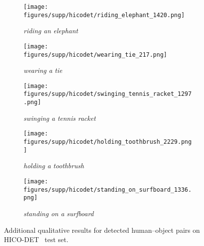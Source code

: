 \documentclass[10pt,twocolumn,letterpaper]{article}
\begin{document}
\begin{figure*}
    \begin{subfigure}[t]{0.19\linewidth}
        \centering
        \texttt{[image: figures/supp/hicodet/riding\_elephant\_1420.png]}
        \caption{\textit{riding an elephant}}
        \label{fig:riding-elephant}
    \end{subfigure}
    \hspace{4pt}
    \begin{subfigure}[t]{0.19\linewidth}
        \centering
        \texttt{[image: figures/supp/hicodet/wearing\_tie\_217.png]}
        \caption{\textit{wearing a tie}}
        \label{fig:wearing-tie}
    \end{subfigure}
    \hspace{-1pt}
    \begin{subfigure}[t]{0.19\linewidth}
        \centering
        \texttt{[image: figures/supp/hicodet/swinging\_tennis\_racket\_1297.png]}
        \caption{\textit{swinging a tennis racket}}
        \label{fig:swinging-tennis-racket}
    \end{subfigure}
    \hfill \begin{subfigure}[t]{0.19\linewidth}
        \centering
        \texttt{[image: figures/supp/hicodet/holding\_toothbrush\_2229.png]}
        \caption{\textit{holding a toothbrush}}
        \label{fig:holding-toothbrush}
    \end{subfigure}
    \hfill \begin{subfigure}[t]{0.19\linewidth}
        \centering
        \texttt{[image: figures/supp/hicodet/standing\_on\_surfboard\_1336.png]}
        \caption{\textit{standing on a surfboard}}
        \label{fig:standing-on-surfboard}
    \end{subfigure}
    \caption{Additional qualitative results for detected human--object pairs on HICO-DET~\cite{hicodet} test set.}
    \label{fig:qual-hicodet}
\end{figure*}
\end{document}
